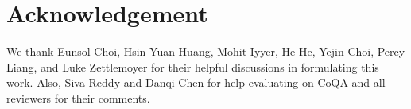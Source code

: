 \documentclass[11pt,a4paper]{article}
\begin{document}
 \section*{Acknowledgement}
We thank Eunsol Choi, Hsin-Yuan Huang, Mohit Iyyer, He He, Yejin Choi, Percy Liang, and Luke Zettlemoyer for their helpful discussions in formulating this work. Also, Siva Reddy and Danqi Chen for help evaluating on CoQA and all reviewers for their comments.



\end{document}
